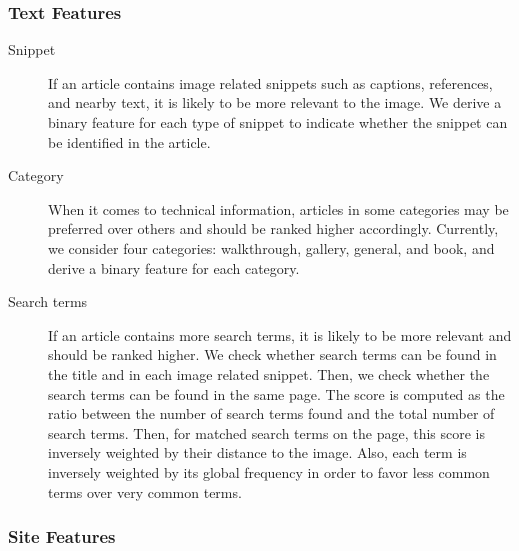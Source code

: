\documentclass{www2010-submission}
\begin{document}
\subsubsection{Text Features}

\begin{description}

\item[Snippet] If an article contains image related snippets such as
  captions, references, and nearby text, it is likely to be more
  relevant to the image. We derive a binary feature for each type of
  snippet to indicate whether the snippet can be identified in the
  article.

\item[Category] When it comes to technical information, articles in
  some categories may be preferred over others and should be ranked
  higher accordingly. Currently, we consider four categories:
  walkthrough, gallery, general, and book, and derive a binary feature
  for each category.

\item[Search terms] If an article contains more search terms, it is
  likely to be more relevant and should be ranked higher. We check
  whether search terms can be found in the title and in each image
  related snippet. Then, we check whether the search terms can be
  found in the same page. The score is computed as the ratio between
  the number of search terms found and the total number of search
  terms. Then, for matched search terms on the page, this score is
  inversely weighted by their distance to the image. Also, each
  term is inversely weighted by its global frequency in order to favor
  less common terms over very common terms.

\end{description}

\subsubsection{Site Features}
\end{document}
